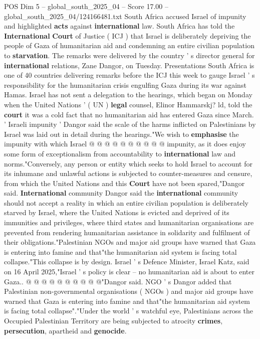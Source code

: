 \begin{textsample}{POS Dim 5 – global\_south\_2025\_04 – Score 17.00 – global\_south\_2025\_04/124166481.txt}  \label{ex:f5_pos_085}
South Africa accused Israel of impunity and highlighted \textbf{acts} against \textbf{international} law.
South Africa has told the \textbf{International} \textbf{Court} of Justice ( ICJ ) that Israel is deliberately depriving the people of Gaza of humanitarian aid and condemning an entire civilian population to \textbf{starvation}.
The remarks were delivered by the country ' s director general for \textbf{international} relations, Zane Dangor, on Tuesday.
Presentations South Africa is one of 40 countries delivering remarks before the ICJ this week to gauge Israel ' s responsibility for the humanitarian crisis engulfing Gaza during its war against Hamas.
Israel has not sent a delegation to the hearings, which began on Monday when the United Nations ' ( UN ) \textbf{legal} counsel, Elinor Hammarskj? ld, told the \textbf{court} it was a cold fact that no humanitarian aid has entered Gaza since March. ' Israeli impunity ' Dangor said the scale of the harms inflicted on Palestinians by Israel was laid out in detail during the hearings."We wish to \textbf{emphasise} the impunity with which Israel @ @ @ @ @ @ @ @ @ @ impunity, as it does enjoy some form of exceptionalism from accountability to \textbf{international} law and norms."Conversely, any person or entity which seeks to hold Israel to account for its inhumane and unlawful actions is subjected to counter-measures and censure, from which the United Nations and this \textbf{Court} have not been spared,"Dangor said. \textbf{International} community Dangor said the \textbf{international} community should not accept a reality in which an entire civilian population is deliberately starved by Israel, where the United Nations is evicted and deprived of its immunities and privileges, where third states and humanitarian organisations are prevented from rendering humanitarian assistance in solidarity and fulfilment of their obligations."Palestinian NGOs and major aid groups have warned that Gaza is entering into famine and that"the humanitarian aid system is facing total collapse."This collapse is by design.
Israel ' s Defence Minister, Israel Katz, said on 16 April 2025,"Israel ' s policy is clear -- no humanitarian aid is about to enter Gaza.. @ @ @ @ @ @ @ @ @ @"Dangor said.
NGO ' s Dangor added that Palestinian non-governmental organisations ( NGOs ) and major aid groups have warned that Gaza is entering into famine and that"the humanitarian aid system is facing total collapse"."Under the world ' s watchful eye, Palestinians across the Occupied Palestinian Territory are being subjected to atrocity \textbf{crimes}, \textbf{persecution}, apartheid and \textbf{genocide}.

\end{textsample}
